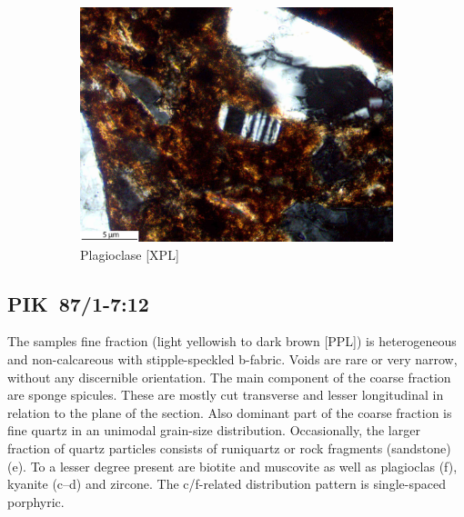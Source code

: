 \documentclass[a4paper]{article}
\begin{document}
\begin{figure}[H]
	\begin{subfigure}[t]{.32\textwidth}
		\includegraphics[width=\textwidth]{ThinSections/10-5_40x_XPL.jpg}
		\caption{Plagioclase [XPL]}
	\end{subfigure}
	\caption{}
	\label{fig:10_pik}
\end{figure}

\newpage\subsection{PIK~87/1-7:12 \citep[pik\#4; Fig.~\ref{fig:pik.pottery}.3; Pikunda-Munda style;][427 Pl.~46.21]{Seidensticker.2021e}}

\begin{multicols}{2}
\noindent The samples fine fraction (light yellowish to dark brown [PPL]) is heterogeneous and non-calcareous with stipple-speckled b-fabric. Voids are rare or very narrow, without any discernible orientation. The main component of the coarse fraction are sponge spicules. These are mostly cut transverse and lesser longitudinal in relation to the plane of the section. Also dominant part of the coarse fraction is fine quartz in an unimodal grain-size distribution. Occasionally, the larger fraction of quartz particles consists of runiquartz or rock fragments (sandstone) (e). To a lesser degree present are biotite and muscovite as well as plagioclas (f), kyanite (c--d) and zircone. The c/f-related distribution pattern is single-spaced porphyric.
\end{multicols}
\end{document}

